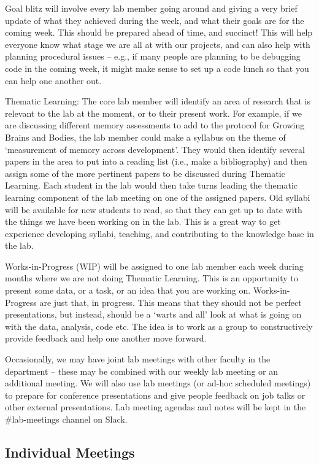 \documentclass[]{book}
\begin{document}
Goal blitz will involve every lab member going around and giving a very brief update of what they achieved during the week, and what their goals are for the coming week. This should be prepared ahead of time, and succinct! This will help everyone know what stage we are all at with our projects, and can also help with planning procedural issues -- e.g., if many people are planning to be debugging code in the coming week, it might make sense to set up a code lunch so that you can help one another out.

Thematic Learning: The core lab member will identify an area of research that is relevant to the lab at the moment, or to their present work. For example, if we are discussing different memory assessments to add to the protocol for Growing Brains and Bodies, the lab member could make a syllabus on the theme of `measurement of memory across development'. They would then identify several papers in the area to put into a reading list (i.e., make a bibliography) and then assign some of the more pertinent papers to be discussed during Thematic Learning. Each student in the lab would then take turns leading the thematic learning component of the lab meeting on one of the assigned papers. Old syllabi will be available for new students to read, so that they can get up to date with the things we have been working on in the lab. This is a great way to get experience developing syllabi, teaching, and contributing to the knowledge base in the lab.

Works-in-Progress (WIP) will be assigned to one lab member each week during months where we are not doing Thematic Learning. This is an opportunity to present some data, or a task, or an idea that you are working on. Works-in-Progress are just that, in progress. This means that they should not be perfect presentations, but instead, should be a `warts and all' look at what is going on with the data, analysis, code etc. The idea is to work as a group to constructively provide feedback and help one another move forward.

Occasionally, we may have joint lab meetings with other faculty in the department -- these may be combined with our weekly lab meeting or an additional meeting. We will also use lab meetings (or ad-hoc scheduled meetings) to prepare for conference presentations and give people feedback on job talks or other external presentations. Lab meeting agendas and notes will be kept in the \#lab-meetings channel on Slack.

\hypertarget{individual-meetings}{%
\subsection{Individual Meetings}\label{individual-meetings}}
\end{document}
